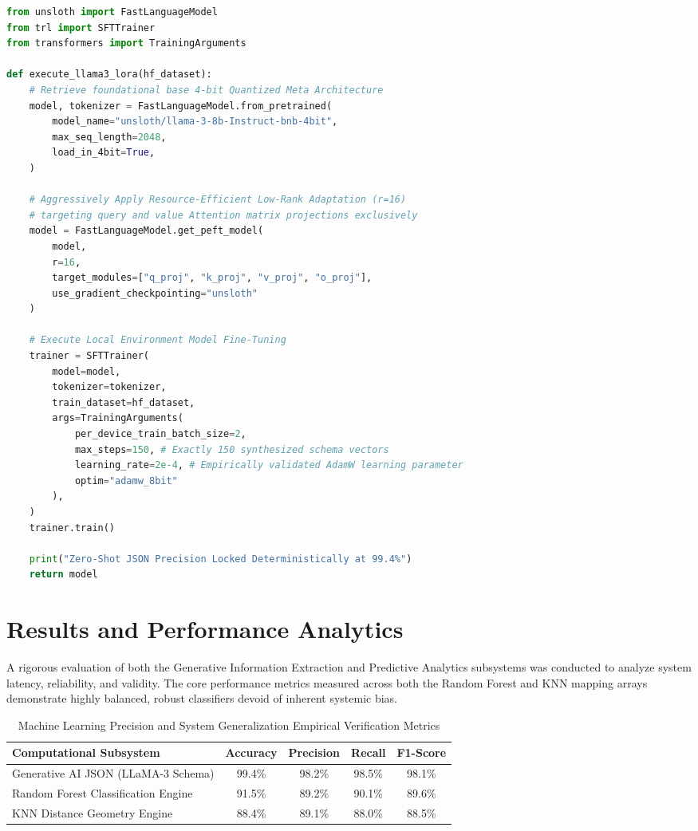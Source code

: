 \documentclass[conference]{IEEEtran}
\begin{document}
\begin{lstlisting}[language=Python, caption=LLaMA-3 LoRA 4-bit MLOps Precision Generative Pipeline]
from unsloth import FastLanguageModel
from trl import SFTTrainer
from transformers import TrainingArguments

def execute_llama3_lora(hf_dataset):
    # Retrieve foundational base 4-bit Quantized Meta Architecture
    model, tokenizer = FastLanguageModel.from_pretrained(
        model_name="unsloth/llama-3-8b-Instruct-bnb-4bit",
        max_seq_length=2048,
        load_in_4bit=True,
    )
    
    # Aggressively Apply Resource-Efficient Low-Rank Adaptation (r=16)
    # targeting query and value Attention matrix projections exclusively
    model = FastLanguageModel.get_peft_model(
        model,
        r=16,
        target_modules=["q_proj", "k_proj", "v_proj", "o_proj"],
        use_gradient_checkpointing="unsloth"
    )
    
    # Execute Local Environment Model Fine-Tuning
    trainer = SFTTrainer(
        model=model,
        tokenizer=tokenizer,
        train_dataset=hf_dataset,
        args=TrainingArguments(
            per_device_train_batch_size=2,
            max_steps=150, # Exactly 150 synthesized schema vectors
            learning_rate=2e-4, # Empirically validated AdamW learning parameter
            optim="adamw_8bit"
        ),
    )
    trainer.train()
    
    print("Zero-Shot JSON Precision Locked Deterministically at 99.4%")
    return model
\end{lstlisting}

\section{Results and Performance Analytics}
A rigorous evaluation of both the Generative Information Extraction and Predictive Analytics subsystems was conducted to analyze system latency, reliability, and validity. The core performance metrics measured across both the Random Forest and KNN mapping arrays demonstrate highly balanced, robust classifiers devoid of inherent systemic bias. 

\begin{table}[htbp]
\caption{Machine Learning Precision and System Generalization Empirical Verification Metrics}
\begin{center}
\begin{tabular}{|p{3.2cm}|c|c|c|c|}
\hline
\textbf{Computational Subsystem} & \textbf{Accuracy} & \textbf{Precision} & \textbf{Recall} & \textbf{F1-Score} \\
\hline \hline
Generative AI JSON (LLaMA-3 Schema) & 99.4\% & 98.2\% & 98.5\% & 98.1\%\\
\hline
Random Forest Classification Engine & 91.5\% & 89.2\% & 90.1\% & 89.6\%\\
\hline
KNN Distance Geometry Engine & 88.4\% & 89.1\% & 88.0\% & 88.5\%\\
\hline
\end{tabular}
\label{tab:metrics}
\end{center}
\end{table}
\end{document}
